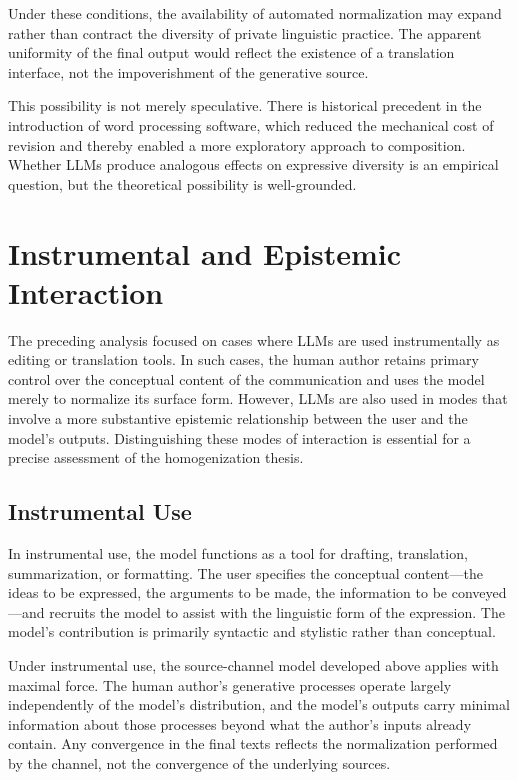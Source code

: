 \documentclass[12pt,a4paper]{article}
\theoremstyle{definition}
\theoremstyle{plain}
\theoremstyle{remark}
\begin{document}
Under these conditions, the availability of automated normalization may expand rather than
contract the diversity of private linguistic practice. The apparent uniformity of the final
output would reflect the existence of a translation interface, not the impoverishment of the
generative source.

This possibility is not merely speculative. There is historical precedent in the introduction
of word processing software, which reduced the mechanical cost of revision and thereby enabled
a more exploratory approach to composition. Whether LLMs produce analogous effects on
expressive diversity is an empirical question, but the theoretical possibility is well-grounded.

\section{Instrumental and Epistemic Interaction}
\label{sec:instrumental}

The preceding analysis focused on cases where LLMs are used instrumentally as editing or
translation tools. In such cases, the human author retains primary control over the conceptual
content of the communication and uses the model merely to normalize its surface form. However,
LLMs are also used in modes that involve a more substantive epistemic relationship between
the user and the model's outputs. Distinguishing these modes of interaction is essential for
a precise assessment of the homogenization thesis.

\subsection{Instrumental Use}

In instrumental use, the model functions as a tool for drafting, translation, summarization,
or formatting. The user specifies the conceptual content---the ideas to be expressed, the
arguments to be made, the information to be conveyed---and recruits the model to assist with
the linguistic form of the expression. The model's contribution is primarily syntactic and
stylistic rather than conceptual.

Under instrumental use, the source-channel model developed above applies with maximal force.
The human author's generative processes operate largely independently of the model's
distribution, and the model's outputs carry minimal information about those processes
beyond what the author's inputs already contain. Any convergence in the final texts reflects
the normalization performed by the channel, not the convergence of the underlying sources.
\end{document}
